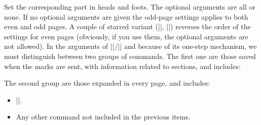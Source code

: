 \documentclass[a4paper]{ltxguide}
\begin{document}
Set the corresponding part in heads and foots.  The optional arguments 
are all or none.  If no optional arguments are given the odd-page 
settings applies to both even and odd pages.  A couple of starred 
variant (|\setfoot*|, |\sethead*|) reverses the order of the settings 
for even pages (obviously, if you use them, the optional arguments are 
not allowed).  In the arguments of |\sethead|/|\setfoot| and because 
of its one-step mechanism, we must distinguish between two groups of 
commands.  The first one are those saved when the marks are sent, with 
information related to sections, and includes:
The second group are those expanded in every page, and includes:
\begin{itemize}
\item |\thepage|.
\item Any other command not included in the previous items. 
\end{itemize}
\end{document}
